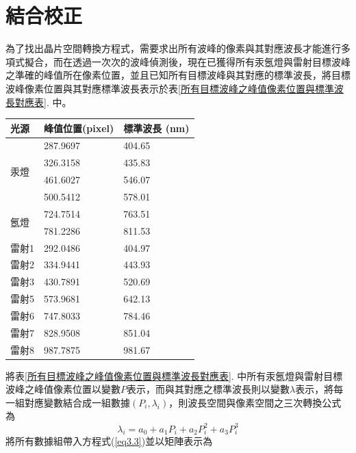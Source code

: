 \section{結合校正}
為了找出晶片空間轉換方程式，需要求出所有波峰的像素與其對應波長才能進行多項式擬合，而在透過一次次的波峰偵測後，現在已獲得所有汞氬燈與雷射目標波峰之準確的峰值所在像素位置，並且已知所有目標波峰與其對應的標準波長，將目標波峰像素位置與其對應標準波長表示於表\ref{所有目標波峰之峰值像素位置與標準波長對應表}. 中。
\begin{center}
	\vspace{0.8cm}
\label{所有目標波峰之峰值像素位置與標準波長對應表}
\begin{tabularx}{\textwidth}{m{}<{\centering}m{}<{\centering}m{}<{\centering}}
	\hline\hline
	光源&峰值位置(pixel) & 標準波長 (nm)\\		
	\hline
	\multirow{4}{*}{汞燈 }
	&287.9697&	404.65\\
	&326.3158&	435.83\\
	&461.6027&	546.07\\
	&500.5412&	578.01\\
	\hline
	\multirow{2}{*}{氬燈 }
	&724.7514&	763.51\\
	&781.2286&	811.53\\  
	\hline	
	雷射1&292.0486	&404.97 \\
	雷射2&334.9441	&443.93 \\
	雷射3&430.7891	&520.69 \\
	雷射5&573.9681	&642.13 \\
	雷射6&747.8033	&784.46 \\
	雷射7&828.9508	&851.04 \\
	雷射8&987.7875	&981.67 \\
	\hline\hline
\end{tabularx}
\vspace{10pt}
\end{center}
將表\ref{所有目標波峰之峰值像素位置與標準波長對應表}. 中所有汞氬燈與雷射目標波峰之峰值像素位置以變數$P$表示，而與其對應之標準波長則以變數$\lambda$表示，將每一組對應變數結合成一組數據$(P_i,\lambda_i)$，則波長空間與像素空間之三次轉換公式為
\begin{equation}\label{eq3.3}
	\lambda_i= a_0+a_1 P_i+a_2 P_{i}^2+a_3 P_{i}^3
\end{equation}
將所有數據組帶入方程式(\ref{eq3.3})並以矩陣表示為
